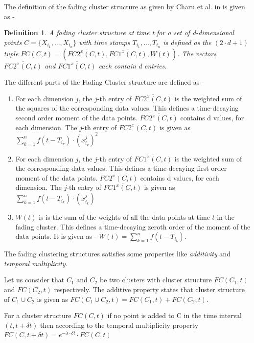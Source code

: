 \documentclass[a4paper,12bp]{report}
\begin{document}
The definition of the fading cluster structure as given by Charu et al. in \cite{Aggarwal:2005} is given as - 
\newtheorem{mydef}{Definition}
\begin{mydef}
A fading cluster structure at time t for a set of d-dimensional points $C = \{X_{i_{1}}, ..., X_{i_{n}}\}$ with time stamps $T_{i_{1}}, ... , T_{i_{n}}$ is defined as the $(2 \cdot d + 1)$ tuple $FC(C,t) = (\overline{FC2^{x}(C,t)}, \overline{FC1^{x}(C,t)}, W(t))$. The vectors $\overline{FC2^{x}(C,t)}$ and $\overline{FC1^{x}(C,t)}$ each contain d entries. 
\end{mydef}

The different parts of the Fading Cluster structure are defined as - 
\begin{enumerate}
\item For each dimension $j$, the $j$-th entry of $\overline{FC2^{x}(C,t)}$ is the weighted sum of the squares of the corresponding data values. This defines a time-decaying second order moment of the data points. $\overline{FC2^{x}(C,t)}$ contains d values, for each dimension. The $j$-th entry of $\overline{FC2^{x}(C,t)}$ is given as $\sum_{k=1}^{n} f(t-T_{i_{k}}) \cdot (x_{i_{k}}^{j})^2$

\item For each dimension $j$, the $j$-th entry of $\overline{FC1^{x}(C,t)}$ is the weighted sum of the corresponding data values. This defines a time-decaying first order moment of the data points. $\overline{FC2^{x}(C,t)}$ contains d values, for each dimension. The $j$-th entry of $\overline{FC1^{x}(C,t)}$ is given as $\sum_{k=1}^{n} f(t-T_{i_{k}}) \cdot (x_{i_{k}}^{j})$

\item $W(t)$ is is the sum of the weights of all the data points at time $t$ in the fading cluster. This defines a time-decaying zeroth order of the moment of the data points. It is given as - $W(t) = \sum_{k=1}^{n} f(t-T_{i_{k}})$.
\end{enumerate}

The fading clustering structures satisfies some properties like \textit{additivity} and \textit{temporal multiplicity}.

Let us consider that $C_{1}$ and $C_{2}$ be two clusters with cluster structure $FC(C_{1},t)$ and $FC(C_{2},t)$ respectively. The additive property states that cluster structure of $C_{1} \cup C_{2}$ is given as $FC(C_{1} \cup C_{2}, t) = FC(C_{1}, t) + FC(C_{2}, t)$.

For a cluster structure $FC(C,t)$ if no point is added to C in the time interval $(t, t+\delta t)$ then according to the temporal multiplicity property $FC(C, t+\delta t) = e^{-\lambda \cdot \delta t} \cdot FC(C,t)$ 
\end{document}
